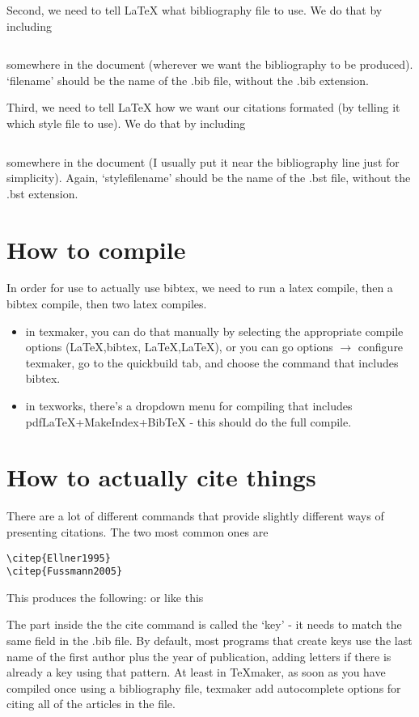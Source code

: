 \documentclass[11pt,a4paper]{article}
\begin{document}
Second, we need to tell LaTeX what bibliography file to use. We do that by including
\begin{verbatim}

\end{verbatim}
somewhere in the document (wherever we want the bibliography to be produced). `filename' should be the name of the .bib file, without the .bib extension.

Third, we need to tell LaTeX how we want our citations formated (by telling it which style file to use). We do that by including
\begin{verbatim}

\end{verbatim}
somewhere in the document (I usually put it near the bibliography line just for simplicity). Again, `stylefilename' should be the name of the .bst file, without the .bst extension.

\section{How to compile}
In order for use to actually use bibtex, we need to run a latex compile, then a bibtex compile, then two latex compiles.
\begin{itemize}
\item in texmaker, you can do that manually by selecting the appropriate compile options (\LaTeX,bibtex, \LaTeX,\LaTeX), or you can go options $\rightarrow$ configure texmaker, go to the quickbuild tab, and choose the command that includes bibtex.
\item in texworks, there's a dropdown menu for compiling that includes pdfLaTeX+MakeIndex+BibTeX - this should do the full compile.
\end{itemize}

\section{How to actually cite things}

There are a lot of different commands that provide slightly different ways of presenting citations. The two most common ones are
\begin{verbatim}
\citep{Ellner1995}
\citep{Fussmann2005}
\end{verbatim}

This produces the following: \citep{Ellner1995} or like this \cite{Fussmann2005}

The part inside the the cite command is called the `key' - it needs to match the same field in the .bib file. By default, most programs that create keys use the last name of the first author plus the year of publication, adding letters if there is already a key using that pattern. At least in TeXmaker, as soon as you have compiled once using a bibliography file, texmaker add autocomplete options for citing all of the articles in the file.
\end{document}
